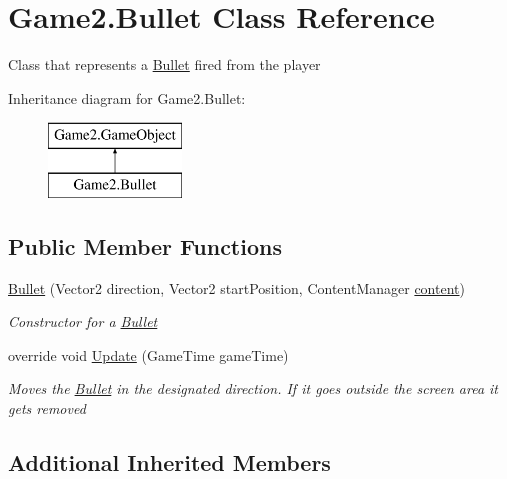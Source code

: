 \hypertarget{class_game2_1_1_bullet}{}\section{Game2.\+Bullet Class Reference}
\label{class_game2_1_1_bullet}


Class that represents a \mbox{\hyperlink{class_game2_1_1_bullet}{Bullet}} fired from the player  


Inheritance diagram for Game2.\+Bullet\+:\begin{figure}[H]
\begin{center}
\leavevmode
\includegraphics[height=2.000000cm]{class_game2_1_1_bullet}
\end{center}
\end{figure}
\subsection*{Public Member Functions}
\begin{DoxyCompactItemize}
\item 
\mbox{\hyperlink{class_game2_1_1_bullet_aa5376505fe806d88f708315e7ecdacb6}{Bullet}} (Vector2 direction, Vector2 start\+Position, Content\+Manager \mbox{\hyperlink{class_game2_1_1_game_object_ae8a9e4574e531d2fbb2168a155f2ac53}{content}})
\begin{DoxyCompactList}\small\item\em Constructor for a \mbox{\hyperlink{class_game2_1_1_bullet}{Bullet}} \end{DoxyCompactList}\item 
override void \mbox{\hyperlink{class_game2_1_1_bullet_a2cf7c4b1a587f2b7e92611d5f6173d3e}{Update}} (Game\+Time game\+Time)
\begin{DoxyCompactList}\small\item\em Moves the \mbox{\hyperlink{class_game2_1_1_bullet}{Bullet}} in the designated direction. If it goes outside the screen area it gets removed \end{DoxyCompactList}\end{DoxyCompactItemize}
\subsection*{Additional Inherited Members}


